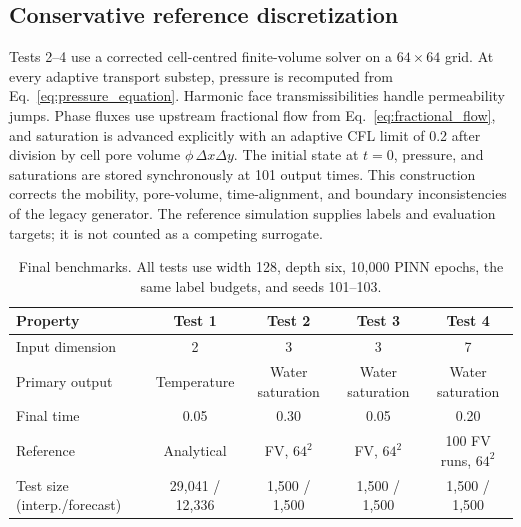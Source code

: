 \subsection{Conservative reference discretization}

Tests 2--4 use a corrected cell-centred finite-volume solver on a \(64\times64\) grid. At every adaptive transport substep, pressure is recomputed from Eq.~\eqref{eq:pressure_equation}. Harmonic face transmissibilities handle permeability jumps. Phase fluxes use upstream fractional flow from Eq.~\eqref{eq:fractional_flow}, and saturation is advanced explicitly with an adaptive CFL limit of 0.2 after division by cell pore volume \(\phi\,\Delta x\Delta y\). The initial state at \(t=0\), pressure, and saturations are stored synchronously at 101 output times. This construction corrects the mobility, pore-volume, time-alignment, and boundary inconsistencies of the legacy generator. The reference simulation supplies labels and evaluation targets; it is not counted as a competing surrogate.

\begin{table}[t]
\centering
\footnotesize
\setlength{\tabcolsep}{5pt}
\caption{Final benchmarks. All tests use width 128, depth six, 10,000 PINN epochs, the same label budgets, and seeds 101--103.}
\label{tab:configuration}
\begin{tabular}{@{}lcccc@{}}
\toprule
Property & Test 1 & Test 2 & Test 3 & Test 4\\
\midrule
Input dimension & 2 & 3 & 3 & 7\\
Primary output & Temperature & Water saturation & Water saturation & Water saturation\\
Final time & 0.05 & 0.30 & 0.05 & 0.20\\
Reference & Analytical & FV, \(64^2\) & FV, \(64^2\) & 100 FV runs, \(64^2\)\\
Test size (interp./forecast) & 29,041 / 12,336 & 1,500 / 1,500 & 1,500 / 1,500 & 1,500 / 1,500\\
\bottomrule
\end{tabular}
\end{table}
